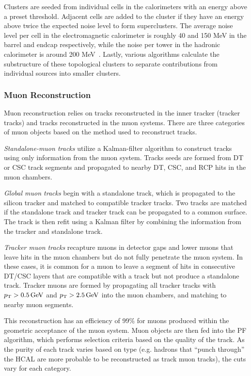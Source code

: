 Clusters are seeded from individual cells in the calorimeters with an energy above a preset threshold. Adjacent cells are added to the cluster if they have an energy above twice the expected noise level to form superclusters. The average noise level per cell in the electromagnetic calorimeter is roughly 40 and 150 MeV in the barrel and endcap respectively, while the noise per tower in the hadronic calorimeter is around 200 MeV~\cite{Sirunyan:PF}. Lastly, various algorithms calculate the substructure of these topological clusters to separate contributions from individual sources into smaller clusters.

\subsubsection{Muon Reconstruction} \label{sec:CMS_Reco_mu}
Muon reconstruction relies on tracks reconstructed in the inner tracker (tracker tracks) and tracks reconstructed in the muon systems. There are three categories of muon objects based on the method used to reconstruct tracks.

\textit{Standalone-muon tracks} utilize a Kalman-filter algorithm to construct tracks using only information from the muon system. Tracks seeds are formed from DT or CSC track segments and propagated to nearby DT, CSC, and RCP hits in the muon chambers.

\textit{Global muon tracks} begin with a standalone track, which is propagated to the silicon tracker and matched to compatible tracker tracks. Two tracks are matched if the standalone track and tracker track can be propagated to a common surface. The track is then refit using a Kalman filter by combining the information from the tracker and standalone track. 

\textit{Tracker muon tracks} recapture muons in detector gaps and lower \PT muons that leave hits in the muon chambers but do not fully penetrate the muon system. In these cases, it is common for a muon to leave a segment of hits in consecutive DT/CSC layers that are compatible with a track but not produce a standalone track. Tracker muons are formed by propagating all tracker tracks with $p_{\mathrm{T}} > 0.5\,\text{Ge\hspace{-.08em}V}$ and $p_{\mathrm{T}}>2.5\,\text{Ge\hspace{-.08em}V}$ into the muon chambers, and matching to nearby muon segments.

This reconstruction has an efficiency of 99\% for muons produced within the geometric acceptance of the muon system\cite{Sirunyan:2313130}. Muon objects are then fed into the PF algorithm, which performs selection criteria based on the quality of the track. As the purity of each track varies based on type (e.g. hadrons that ``punch through'' the HCAL are more probable to be reconstructed as track muon tracks), the cuts vary for each category.

